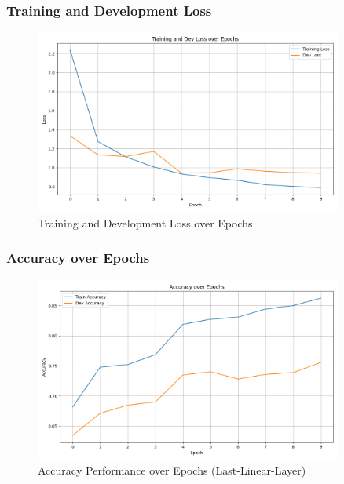 \documentclass{beamer}
\begin{document}
\begin{frame}
\frametitle{Training and Development Loss}
\centering
\begin{figure}
  \includegraphics[width=0.9\textwidth]{last-linear-layer/loss_metrics.png}
  \caption{Training and Development Loss over Epochs}
\end{figure}
\end{frame}

\begin{frame}
\frametitle{Accuracy over Epochs}
\centering
\begin{figure}
  \includegraphics[width=0.9\textwidth]{last-linear-layer/accuracy_metrics.png}
  \caption{Accuracy Performance over Epochs (Last-Linear-Layer)}
\end{figure}
\end{frame}
\end{document}
